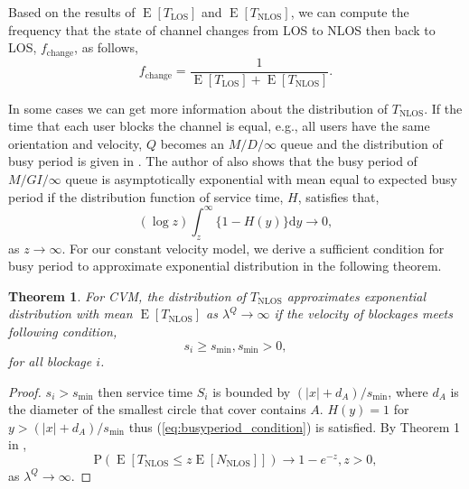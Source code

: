 \documentclass[10pt, conference, letterpaper]{IEEEtran}
\newtheorem{theorem}{Theorem}
\DeclareMathOperator*{\E}{\mathrm{E}}
\DeclareMathOperator*{\LOS}{\mathrm{LOS}}
\DeclareMathOperator*{\NLOS}{\mathrm{NLOS}}
\begin{document}
Based on the results of $\E[T_{\LOS}]$ and $\E[T_{\NLOS}]$, we can compute the frequency that the state of channel changes from LOS to NLOS then back to LOS, $f_{\mathrm{change}}$, as follows,
\begin{equation*}\label{eq:frequency}
f_{\mathrm{change}} = \frac{1}{\E[T_{\LOS}] + \E[T_{\NLOS}]}.
\end{equation*}  

In some cases we can get more information about the distribution of $T_{\NLOS}$. If the time that each user blocks the channel is equal, e.g., all users have the same orientation and velocity, $Q$ becomes an $M/D/\infty$ queue and the distribution of busy period is given in \cite{busyperiod_heavytraffic}. The author of \cite{busyperiod_heavytraffic} also shows that the busy period of $M/GI/\infty$ queue is asymptotically exponential with mean equal to expected busy period if the distribution function of service time, $H$, satisfies that,  
\begin{equation}\label{eq:busyperiod_condition}
(\log z) \int_{z}^{\infty}\{1-H(y)\}\mathrm{d}y\rightarrow 0,
\end{equation}
as $z\rightarrow \infty$. 
For our constant velocity model, we derive a sufficient condition for busy period to approximate exponential distribution in the following theorem.

\begin{theorem}\label{theorem:T_NLOS_exp}
For CVM, the distribution of $T_{\NLOS}$ approximates exponential distribution with mean $\E[T_{\NLOS}]$ as $\lambda^Q\rightarrow \infty$ if the velocity of blockages meets following condition,
\begin{equation}\label{condition:T_NLOS_exp}
s_i\geq s_{\min}, s_{\min}>0,
\end{equation} 
for all blockage $i$.
\end{theorem}

\begin{proof}
$s_i>s_{\min}$ then service time $S_i$ is bounded by $(|x|+d_A)/s_{\min}$, where $d_A$ is the diameter of the smallest circle that cover contains $A$. $H(y) = 1$ for $y>(|x|+d_A)/s_{\min}$ thus (\ref{eq:busyperiod_condition}) is satisfied. By Theorem 1 in \cite{busyperiod_heavytraffic}, 
\begin{equation*}
\mathrm{P}(\E[T_{\NLOS} \leq z\E[N_{\NLOS}]]) \rightarrow 1-e^{-z}, z>0,
\end{equation*} 
as $\lambda^Q\rightarrow \infty$.
\end{proof}
\end{document}
